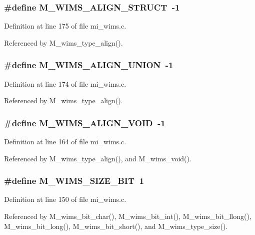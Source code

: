 \subsubsection{\setlength{\rightskip}{0pt plus 5cm}\#define M\_\-WIMS\_\-ALIGN\_\-STRUCT~-1}\label{mi__wims_8c_151108b9e9c48be1fd46db7e427a81e6}




Definition at line 175 of file mi\_\-wims.c.

Referenced by M\_\-wims\_\-type\_\-align().
\subsubsection{\setlength{\rightskip}{0pt plus 5cm}\#define M\_\-WIMS\_\-ALIGN\_\-UNION~-1}\label{mi__wims_8c_eca7cc7c543fbc1736fb1cdfa3205919}




Definition at line 174 of file mi\_\-wims.c.

Referenced by M\_\-wims\_\-type\_\-align().
\subsubsection{\setlength{\rightskip}{0pt plus 5cm}\#define M\_\-WIMS\_\-ALIGN\_\-VOID~-1}\label{mi__wims_8c_79e870bb3815d07e5bcbdb192cb658bc}




Definition at line 164 of file mi\_\-wims.c.

Referenced by M\_\-wims\_\-type\_\-align(), and M\_\-wims\_\-void().
\subsubsection{\setlength{\rightskip}{0pt plus 5cm}\#define M\_\-WIMS\_\-SIZE\_\-BIT~1}\label{mi__wims_8c_8dbe9284cda1ce15e904db2b2b0c70cd}




Definition at line 150 of file mi\_\-wims.c.

Referenced by M\_\-wims\_\-bit\_\-char(), M\_\-wims\_\-bit\_\-int(), M\_\-wims\_\-bit\_\-llong(), M\_\-wims\_\-bit\_\-long(), M\_\-wims\_\-bit\_\-short(), and M\_\-wims\_\-type\_\-size().
